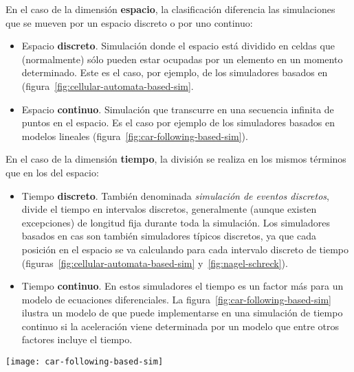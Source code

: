 En el caso de la dimensión \textbf{espacio}, la clasificación diferencia las simulaciones que se mueven por un espacio discreto o por uno continuo:

\begin{itemize}
	\item Espacio \textbf{discreto}. Simulación donde el espacio está dividido en celdas que (normalmente) sólo pueden estar ocupadas por un elemento en un momento determinado. Este es el caso, por ejemplo, de los simuladores basados en  (figura~\ref{fig:cellular-automata-based-sim}.
	\item Espacio \textbf{continuo}. Simulación que transcurre en una secuencia infinita de puntos en el espacio. Es el caso por ejemplo de los simuladores basados en modelos lineales (figura~\ref{fig:car-following-based-sim}).
\end{itemize}

En el caso de la dimensión \textbf{tiempo}, la división se realiza en los mismos términos que en los del espacio:

\begin{itemize}
	\item Tiempo \textbf{discreto}. También denominada \textit{simulación de eventos discretos}, divide el tiempo en intervalos discretos, generalmente (aunque existen excepciones) de longitud fija durante toda la simulación. Los simuladores basados en \acp{ca} son también simuladores típicos discretos, ya que cada posición en el espacio se va calculando para cada intervalo discreto de tiempo (figuras~\ref{fig:cellular-automata-based-sim} y~\ref{fig:nagel-schreck}).
	\item Tiempo \textbf{continuo}. En estos simuladores el tiempo es un factor más para un modelo de ecuaciones diferenciales. La figura~\ref{fig:car-following-based-sim} ilustra un modelo de \textit{} que puede implementarse en una simulación de tiempo continuo si la aceleración viene determinada por un modelo que entre otros factores incluye el tiempo.
\end{itemize}

\begin{figure*}[t]
	\centering
	\texttt{[image: car-following-based-sim]}
	\caption[Ejemplo de modelo lineal en un espacio continuo]{Ejemplo de un modelo lineal en un espacio continuo. La posición del vehículo es un valor $x \in \mathbb{R}$. Este ejemplo muestra un modelo de \textit{car-following} donde el comportamiento de la aceleración del vehículo es determinado por la distancia al coche siguiente. Fuente:~\cite{Tordeux2011}.}
	\label{fig:car-following-based-sim}
\end{figure*}

